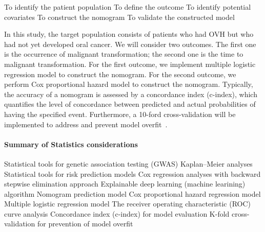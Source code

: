 \documentclass[12pt, a4paper]{article}
\begin{document}
\begin{outline}

\1 To identify the patient population
\1 To define the outcome
\1 To identify potential covariates
\1 To construct the nomogram
\1 To validate the constructed model
\end{outline}

In this study, the target population consists of patients who had OVH but who had not yet developed oral cancer. We will consider two outcomes. The first one is the occurrence of malignant transformation; the second one is the time to malignant transformation. For the first outcome, we implement multiple logistic regression model to construct the nomogram. For the second outcome, we perform Cox proportional hazard model to construct the nomogram. 
Typically, the accuracy of a nomogram is assessed by a concordance index (c-index), which quantifies the level of concordance between predicted and actual probabilities of having the specified event. Furthermore, a 10-ford cross-validation will be implemented to address and prevent model overfit~\citep{Iasonos2008}. 

\paragraph{Summary of Statistics considerations}
\begin{outline}


\1 Statistical tools for genetic association testing (GWAS) 
\1 Kaplan--Meier analyses \1 Statistical tools for risk prediction models 
\1 Cox regression analyses
with backward stepwise elimination approach
\1 Explainable deep learning (machine learining) algorithm
\1 Nomogram prediction model
    \2 Cox proportional hazard regression model
    \2 Multiple logistic regression model
\1 The receiver operating characteristic (ROC) curve analysis
\1 Concordance index (c-index) for model evaluation
\1 K-fold cross-validation for prevention of model overfit

\end{outline}

\clearpage



%
\end{document}
